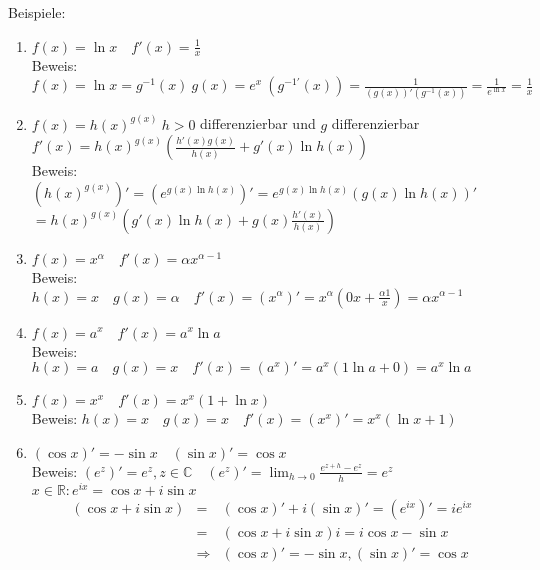 \documentclass[ngerman,titlepage,twoside, parskip=half*]{scrreprt}
\newcommand*{\R}{\mathbb{R}}
\newcommand*{\C}{\mathbb{C}}
\theoremstyle{plain}
\theoremstyle{definition}
\theoremstyle{remark}
\begin{document}
Beispiele:
\begin{enumerate}[(1)]
  \item $f(x)=\ln x\quad f'(x)=\frac{1}{x}$\\
    Beweis: $f(x)=\ln x=g^{-1}(x)\ g(x)=e^x\ (g^{-1'}(x))=
    \frac{1}{(g(x))'(g^{-1}(x))}=\frac{1}{e^{\ln x}}=\frac{1}{x}$
  \item $f(x)=h(x)^{g(x)}\ h>0$ differenzierbar und $g$ differenzierbar\\
    $f'(x)=h(x)^{g(x)}(\frac{h'(x)g(x)}{h(x)}+g'(x)\ln h(x))$\\
    Beweis: $(h(x)^{g(x)})'=(e^{g(x)\ln h(x)})'=e^{g(x)\ln h(x)}
    (g(x)\ln h(x))'$\\
    $=h(x)^{g(x)}(g'(x)\ln h(x)+g(x)\frac{h'(x)}{h(x)})$
  \item $f(x) = x^\alpha \quad f'(x) = \alpha x^{\alpha-1}$\\
    Beweis: $h(x)=x\quad g(x)=\alpha\quad f'(x)=(x^\alpha)'=x^\alpha
    (0x+\frac{\alpha 1}{x})=\alpha x^{\alpha-1}$
  \item $f(x) = a^x \quad f'(x) = a^x \ln a$\\
    Beweis: $h(x)=a\quad g(x)=x\quad f'(x)=(a^x)'=a^x(1\ln a+0)=a^x\ln a$
  \item $f(x) = x^x \quad f'(x) = x^x(1+\ln x)$\\
    Beweis: $h(x)=x\quad g(x)=x\quad f'(x)=(x^x)'=x^x(\ln x+1)$
  \item $(\cos x)'=-\sin x\quad (\sin x)'=\cos x$\\
    Beweis: $(e^z)'=e^z, z\in\C\quad (e^z)'=\lim_{h\rightarrow 0}
    \frac{e^{z+h}-e^z}{h}=e^z$\\
    $x\in\R\colon e^{ix}=\cos x+i\sin x$
    \begin{align*}
      (\cos x+i\sin x) & = & (\cos x)'+i(\sin x)'=(e^{ix})'=ie^{ix}\\
      & = & (\cos x+i\sin x)i=i\cos x-\sin x\\
      & \Rightarrow & (\cos x)'=-\sin x, (\sin x)'=\cos x
    \end{align*}
\end{enumerate}
\end{document}

